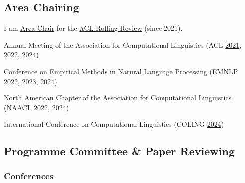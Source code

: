 \subsection*{Area Chairing}

I am \href{https://aclrollingreview.org/aes}{Area Chair} for the \href{https://aclrollingreview.org/}{ACL Rolling Review} (since 2021).

\vspace{.5em}

\begin{itemize*}[label={},
                 itemjoin={{,\space}},
                 afterlabel={},
                 after={{.}}]

    \item Annual Meeting of the Association for Computational Linguistics
    (ACL
    \href{https://aclanthology.org/2021.acl-long.0.pdf}{2021},
    \href{https://aclanthology.org/2022.acl-long.0.pdf}{2022},
    \href{https://aclanthology.org/2024.acl-long.0.pdf}{2024})

    \item Conference on Empirical Methods in Natural Language Processing
    (EMNLP 
    \href{https://aclanthology.org/2022.emnlp-main.0.pdf}{2022},
    \href{https://aclanthology.org/2023.emnlp-main.0.pdf}{2023},
    \href{https://aclanthology.org/2024.emnlp-main.0.pdf}{2024})

    \item North American Chapter of the Association for Computational Linguistics 
    (NAACL
    \href{https://aclanthology.org/2022.naacl-main.0.pdf}{2022},
    \href{https://aclanthology.org/2024.naacl-long.0.pdf}{2024})

    \item International Conference on Computational Linguistics
    (COLING
    \href{https://aclanthology.org/2024.lrec-main.0.pdf}{2024})
    
\end{itemize*}

\subsection*{Programme Committee \& Paper Reviewing}

\subsubsection*{Conferences}

